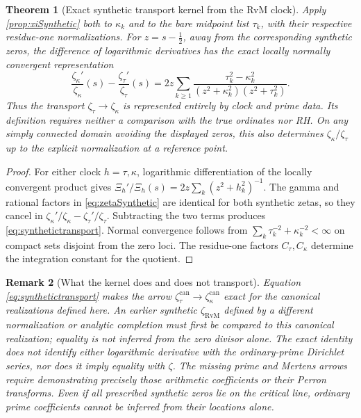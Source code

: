 \documentclass[11pt,reqno]{amsart}
\numberwithin{equation}{section}
\newtheorem{theorem}{Theorem}[section]
\newtheorem{remark}[theorem]{Remark}
\begin{document}
\begin{theorem}[Exact synthetic transport kernel from the RvM clock]
\label{thm:synthetictransport}
Apply \cref{prop:xiSynthetic} both to $\kappa_k$ and to the bare
midpoint list $\tau_k$, with their respective residue-one
normalizations. For $z=s-\tfrac12$, away from the corresponding
synthetic zeros, the difference of logarithmic derivatives has the
\emph{exact} locally normally convergent representation
\begin{equation}\label{eq:synthetictransport}
\frac{\zeta_\kappa'}{\zeta_\kappa}(s)
-\frac{\zeta_\tau'}{\zeta_\tau}(s)
=2z\sum_{k\ge1}
\frac{\tau_k^2-\kappa_k^2}
{(z^2+\kappa_k^2)(z^2+\tau_k^2)}.
\end{equation}
Thus the transport $\zeta_\tau\to\zeta_\kappa$ is
represented entirely by clock and prime data. Its definition
requires neither a comparison with the true ordinates nor RH.
On any simply connected domain avoiding the displayed zeros,
this also determines $\zeta_\kappa/\zeta_\tau$ up to the
explicit normalization at a reference point.
\end{theorem}
\begin{proof}
For either clock $h=\tau,\kappa$, logarithmic
differentiation of the locally convergent product gives
$\Xi_h'/\Xi_h(s)=2z\sum_k(z^2+h_k^2)^{-1}$.
The gamma and rational factors in \eqref{eq:zetaSynthetic}
are identical for both synthetic zetas, so they cancel in
$\zeta_\kappa'/\zeta_\kappa-\zeta_\tau'/\zeta_\tau$.
Subtracting the two terms produces \eqref{eq:synthetictransport}.
Normal convergence follows from
$\sum_k\tau_k^{-2}+\kappa_k^{-2}<\infty$
on compact sets disjoint from the zero loci.
The residue-one factors $C_\tau,C_\kappa$ determine the
integration constant for the quotient.
\end{proof}

\begin{remark}[What the kernel does and does not transport]
\label{rem:transportkernel}
Equation \eqref{eq:synthetictransport} makes the arrow
$\zeta_{\tau}^{\mathrm{can}}\to\zeta_\kappa^{\mathrm{can}}$
exact for the \emph{canonical realizations defined here}.
An earlier synthetic $\zeta_{\mathrm{RvM}}$ defined by a different
normalization or analytic completion must first be compared to
this canonical realization; equality is not inferred from the
zero divisor alone. The exact identity does \emph{not} identify
either logarithmic derivative with the ordinary-prime
Dirichlet series, nor does it imply equality with $\zeta$.
The missing prime and Mertens arrows require demonstrating
precisely those arithmetic coefficients or their Perron
transforms. Even if all prescribed synthetic zeros lie on the
critical line, ordinary prime coefficients cannot be inferred
from their locations alone.
\end{remark}
\end{document}
